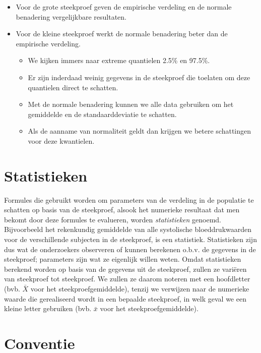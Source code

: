 \documentclass[
  12pt,dutch]{book}
\providecommand{\tightlist}{%
  \setlength{\itemsep}{0pt}\setlength{\parskip}{0pt}}
\theoremstyle{definition}
\theoremstyle{definition}
\theoremstyle{definition}
\theoremstyle{definition}
\theoremstyle{remark}
\begin{document}
\begin{itemize}
\item
  Voor de grote steekproef geven de empirische verdeling en de normale benadering vergelijkbare resultaten.
\item
  Voor de kleine steekproef werkt de normale benadering beter dan de empirische verdeling.

  \begin{itemize}
  \tightlist
  \item
    We kijken immers naar extreme quantielen 2.5\% en 97.5\%.
  \item
    Er zijn inderdaad weinig gegevens in de steekproef die toelaten om deze quantielen direct te schatten.
  \item
    Met de normale benadering kunnen we alle data gebruiken om het gemiddelde en de standaarddeviatie te schatten.
  \item
    Als de aanname van normaliteit geldt dan krijgen we betere schattingen voor deze kwantielen.
  \end{itemize}
\end{itemize}

\section{Statistieken}\label{statistieken}

Formules die gebruikt worden om parameters van de verdeling in de populatie te schatten op basis van de
steekproef, alsook het numerieke resultaat dat men bekomt door deze formules
te evalueren, worden \emph{statistieken} genoemd.
Bijvoorbeeld het
rekenkundig gemiddelde van alle systolische bloeddrukwaarden voor de verschillende subjecten
in de steekproef, is een statistiek. Statistieken zijn dus wat
de onderzoekers observeren of kunnen berekenen o.b.v. de gegevens in de
steekproef; parameters zijn wat ze eigenlijk willen weten.
Omdat statistieken berekend worden op basis van de gegevens uit de steekproef, zullen ze variëren van steekproef tot steekproef.
We zullen ze daarom noteren met een hoofdletter (bvb. \(\bar X\) voor het steekproefgemiddelde), tenzij we verwijzen naar de numerieke waarde die gerealiseerd wordt in een bepaalde steekproef, in welk geval we een kleine letter gebruiken (bvb. \(\bar x\) voor het steekproefgemiddelde).

\section{Conventie}\label{conventie}
\end{document}
